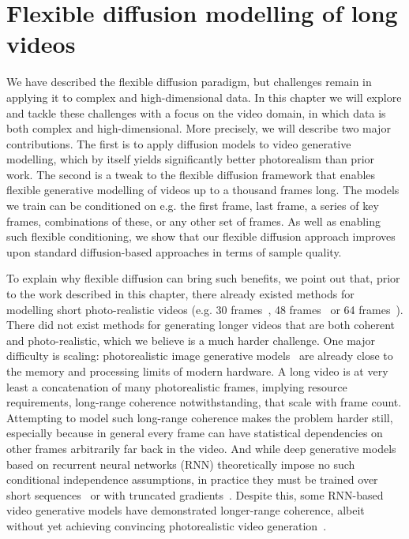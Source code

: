 \chapter{Flexible diffusion modelling of long videos}
\label{ch:fdm}

We have described the flexible diffusion paradigm, but challenges remain in applying it to complex and high-dimensional data. In this chapter we will explore and tackle these challenges with a focus on the video domain, in which data is both complex and high-dimensional. More precisely, we will describe two major contributions. The first is to apply diffusion models to video generative modelling, which by itself yields significantly better photorealism than prior work. The second is a tweak to the flexible diffusion framework that enables flexible generative modelling of videos up to a thousand frames long. The models we train can be conditioned on e.g. the first frame, last frame, a series of key frames, combinations of these, or any other set of frames. As well as enabling such flexible conditioning, we show that our flexible diffusion approach improves upon standard diffusion-based approaches in terms of sample quality.

To explain why flexible diffusion can bring such benefits, we point out that, prior to the work described in this chapter, there already existed methods for modelling short photo-realistic videos (e.g. 30 frames~\citep{weissenborn2019scaling}, 48 frames~\cite{clark2019adversarial} or 64 frames~\citep{ho2022video}). There did not exist methods for generating longer videos that are both coherent and photo-realistic, which we believe is a much harder challenge. One major difficulty is scaling: photorealistic image generative models~\citep{child2020very,dhariwal2021diffusion} are already close to the memory and processing limits of modern hardware.  A long video is at very least a concatenation of many photorealistic frames, implying resource requirements, long-range coherence notwithstanding, that scale with frame count. Attempting to model such long-range coherence makes the problem harder still, especially because in general every frame can have statistical dependencies on other frames arbitrarily far back in the video. And while deep generative models based on recurrent neural networks (RNN) theoretically impose no such conditional independence assumptions, in practice they must be trained over short sequences~\cite{gruslys2016memory,saxena2021clockwork} or with truncated gradients~\citep{tallec2017unbiasing}.  Despite this, some RNN-based video generative models have demonstrated longer-range coherence, albeit without yet achieving convincing photorealistic video generation~\citep{saxena2021clockwork,babaeizadeh2021fitvid,denton2018stochastic,kim2019variational,babaeizadeh2017stochastic}.


